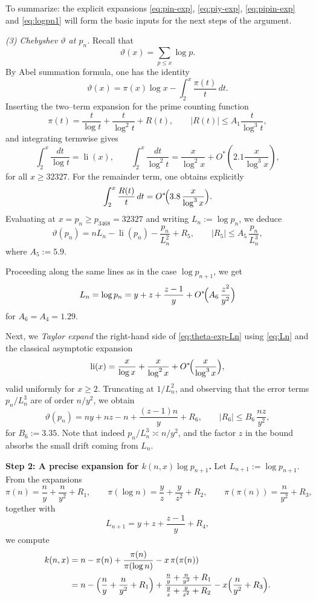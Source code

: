 \documentclass[10pt]{amsart}
\theoremstyle{definition} %
\numberwithin{equation}{section}
\begin{document}
\smallskip
To summarize: the explicit expansions \eqref{eq:pin-exp}, \eqref{eq:piy-exp}, 
\eqref{eq:pipin-exp} and \eqref{eq:logpn1} will form the basic 
inputs for the next steps of the argument.

\medskip
\emph{(3) Chebyshev $\vartheta$ at $p_n$.}
Recall that
\[
\vartheta(x)=\sum_{p\leq x}\log p.
\]
By Abel summation formula, one has the identity
\[
\vartheta(x)=\pi(x)\log x-\int_2^x \frac{\pi(t)}{t}\,dt.
\]
Inserting the two–term expansion for the prime counting function
\[
\pi(t) = \frac{t}{\log t}+\frac{t}{\log^2 t}+R(t),\qquad |R(t)|\le A_1\frac{t}{\log^3 t},
\]
and integrating termwise gives
\[
\int_2^x \frac{dt}{\log t}=\operatorname{li}(x),\qquad
\int_2^x\frac{dt}{\log^2 t}=\frac{x}{\log^2 x}+O^*\!\left(2.1\frac{x}{\log^3 x}\right),
\]
for all $x\geq 32327$. For the remainder term, one obtains explicitly
\[
\int_2^x \frac{R(t)}{t}\,dt = O^*\!\Bigl(3.8\,\frac{x}{\log^3 x}\Bigr).
\]
Evaluating at $x=p_n\geq p_{3468}=32327$ and writing $L_n:=\log p_n$, we deduce
\begin{equation}\label{eq:theta-exp-Ln}
\vartheta(p_n)
= n L_n - \operatorname{li}(p_n) - \frac{p_n}{L_n^2} + R_5,
\qquad |R_5|\le A_5\,\frac{p_n}{L_n^3},
\end{equation}
where $A_5:=5.9$.

\smallskip
Proceeding along the same lines as in the case $\log p_{n+1}$, we get
\begin{equation}\label{eq:Ln}
L_n=\log p_n
= y+z+\frac{z-1}{y}+O^*\!\Bigl(A_6\,\frac{z^2}{y^2}\Bigr)
\end{equation}
for $A_6=A_4=1.29$.

Next, we \emph{Taylor expand} the right-hand side of \eqref{eq:theta-exp-Ln} using
\eqref{eq:Ln} and the classical asymptotic expansion
\[
\operatorname{li}(x)=\frac{x}{\log x}+\frac{x}{\log^2 x}
+O^*\!\Bigl(\frac{x}{\log^3 x}\Bigr),
\]
valid uniformly for $x\ge 2$.  Truncating at $1/L_n^2$, and observing that the
error terms $p_n/L_n^3$ are of order $n/y^2$, we obtain
\begin{equation}\label{eq:theta-fin}
\vartheta(p_n)
= n y + n z - n + \frac{(z-1)n}{y} + R_6,
\qquad |R_6|\le B_6\,\frac{n z}{y^2},
\end{equation}
for $B_6:=3.35$.  Note that indeed $p_n/L_n^3\asymp n/y^2$, and the
factor $z$ in the bound absorbs the small drift coming from $L_n$.

\medskip
\noindent\textbf{Step 2: A precise expansion for $k(n,x)\log p_{n+1}$.}
Let $L_{n+1}:=\log p_{n+1}$. From the expansions
\[
\pi(n)=\frac{n}{y}+\frac{n}{y^2}+R_1,\qquad
\pi(\log n)=\frac{y}{z}+\frac{y}{z^2}+R_2,\qquad
\pi(\pi(n))=\frac{n}{y^2}+R_3,
\]
together with
\[
L_{n+1}=y+z+\frac{z-1}{y}+R_4,
\]
we compute
\[
\begin{aligned}
k(n,x)
&=n-\pi(n)+\frac{\pi(n)}{\pi(\log n)}-x\,\pi(\pi(n))\\
&=n-\Bigl(\frac{n}{y}+\frac{n}{y^2}+R_1\Bigr)
   +\frac{\frac{n}{y}+\frac{n}{y^2}+R_1}
         {\frac{y}{z}+\frac{y}{z^2}+R_2}
   -x\Bigl(\frac{n}{y^2}+R_3\Bigr).
\end{aligned}
\]
\end{document}

